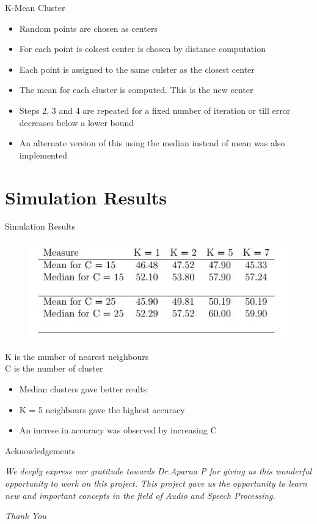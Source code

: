 \documentclass{beamer}
\begin{document}
\begin{frame}{K-Mean Cluster} 
\begin{itemize}
	\item Random points are chosen as centers
	\item For each point is colsest center is chosen by distance computation 
	\item Each point is assigned to the same culster as the closest center
	\item The mean for each cluster is computed. This is the new center
	\item Steps 2, 3 and 4 are repeated for a fixed number of iteration or till error decreases below a lower bound \\ \vspace{0.5cm}
	\item An alternate version of this using the median instead of mean was also implemented
\end{itemize}
\end{frame}

\section{Simulation Results}
\begin{frame}{Simulation Results}
\begin{figure}
	\includegraphics[width=0.7\linewidth]{result.jpg}
\end{figure}
\quad K is the number of nearest neighbours\\
\quad C is the number of cluster\\
\begin{itemize}
	\item Median clusters gave better reults
	\item K = 5 neighbours gave the highest accuracy
	\item An increse in accuracy was observed by increasing C
\end{itemize}
\end{frame}


\begin{frame}{Acknowledgements}
	\par \textit{We deeply express our gratitude towards Dr.Aparna P for giving us this wonderful opportunity to work on this project. This project gave us the opportunity to learn new and important concepts in the field of Audio and Speech Processing.}
\end{frame}

\begin{frame}
	\begin{center}
		\Huge 
		\emph{Thank You}
	\end{center}
\end{frame}
\end{document}
